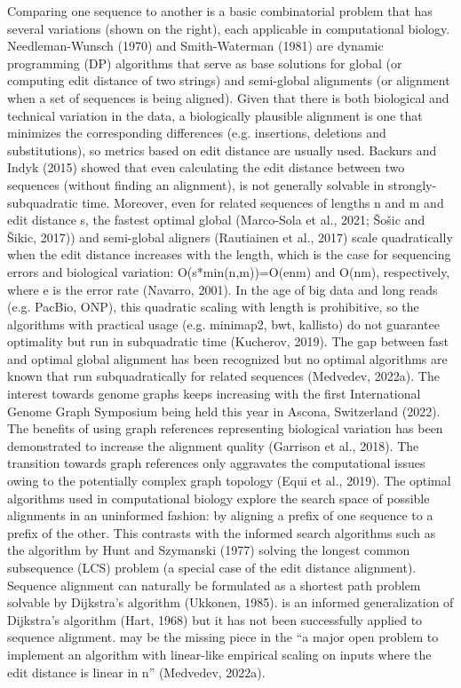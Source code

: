 Comparing one sequence to another is a basic combinatorial problem that has
several variations (shown on the right), each applicable in computational
biology. Needleman-Wunsch (1970)  and Smith-Waterman (1981) are dynamic
programming (DP) algorithms that serve as base solutions for global (or
computing edit distance of two strings) and semi-global alignments (or alignment
when a set of sequences is being aligned). Given that there is both biological
and technical variation in the data, a biologically plausible alignment is one
that minimizes the corresponding differences (e.g. insertions, deletions and
substitutions), so metrics based on edit distance are usually used. Backurs and
Indyk (2015) showed that even calculating the edit distance between two
sequences (without finding an alignment), is not generally solvable in
strongly-subquadratic time. Moreover, even for related sequences of lengths n
and m and edit distance s, the fastest optimal global (Marco-Sola et al., 2021;
Šošic and Šikic, 2017)) and semi-global aligners (Rautiainen et al., 2017) scale
quadratically when the edit distance increases with the length, which is the
case for sequencing errors and biological variation: O(s*min(n,m))=O(enm) and
O(nm), respectively, where e is the error rate (Navarro, 2001). In the age of
big data and long reads (e.g. PacBio, ONP), this quadratic scaling with length
is prohibitive, so the algorithms with practical usage (e.g. minimap2, bwt,
kallisto) do not guarantee optimality but run in subquadratic time (Kucherov,
2019). The gap between fast and optimal global alignment has been recognized but
no optimal algorithms are known that run subquadratically for related sequences
(Medvedev, 2022a). The interest towards genome graphs keeps increasing with the
first International Genome Graph Symposium being held this year in Ascona,
Switzerland (2022). The benefits of using graph references representing
biological variation has been demonstrated to increase the alignment quality
(Garrison et al., 2018). The transition towards graph references only aggravates
the computational issues owing to the potentially complex graph topology (Equi
et al., 2019). The optimal algorithms used in computational biology explore the
search space of possible alignments in an uninformed fashion: by aligning a
prefix of one sequence to a prefix of the other. This contrasts with the
informed search algorithms such as the algorithm by Hunt and Szymanski (1977)
solving the longest common subsequence (LCS) problem (a special case of the edit
distance alignment). Sequence alignment can naturally be formulated as a
shortest path problem solvable by Dijkstra’s algorithm (Ukkonen, 1985). \A is an
informed generalization of Dijkstra’s algorithm (Hart, 1968) but it has not been
successfully applied to sequence alignment. \A may be the missing piece in the
“a major open problem to implement an algorithm with linear-like empirical
scaling on inputs where the edit distance is linear in n” (Medvedev, 2022a).

